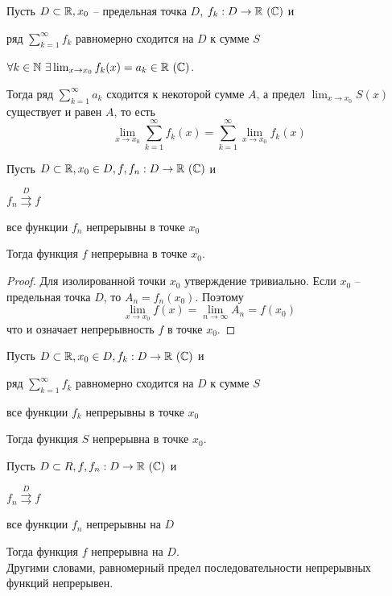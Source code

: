 \begin{Thm}
	Пусть $D \subset \mathbb{R}, x_0$ -- предельная точка $D$, $f_k : D \to \mathbb{R} \ (\mathbb{C})$ и
	\begin{MyList}
		\item ряд $\sum_{k=1}^{\infty} f_k$ равномерно сходится на $D$ к сумме $S$
		\item $\forall k \in \mathbb{N} \ \exists \lim_{x \to x_0} f_k(x) = a_k \in \mathbb{R} \ (\mathbb{C})$.  
	\end{MyList}
	Тогда ряд $\sum_{k=1}^{\infty} a_k$ сходится к некоторой сумме $A$, а предел $\lim_{x \to x_0} S(x)$ существует и равен $A$, то есть
	\[\lim_{x \to x_0} \sum_{k=1}^{\infty} f_k(x) = \sum_{k=1}^{\infty} \lim_{x \to x_0} f_k(x)\]  
\end{Thm}

\begin{Cons}
	Пусть $D \subset \mathbb{R}, x_0 \in D, f, f_n : D \to \mathbb{R} \ (\mathbb{C})$ и
	\begin{MyList}
		\item $f_n \overset{D}{\rightrightarrows} f$  
		\item все функции $f_n$ непрерывны в точке $x_0$ 
	\end{MyList} 
	Тогда функция $f$ непрерывна в точке $x_0$.
\end{Cons}

\begin{proof}
	Для изолированной точки $x_0$ утверждение тривиально. Если $x_0$ -- предельная точка $D$, то $A_n = f_n(x_0)$. Поэтому
	\[\lim_{x \to x_0} f(x) = \lim_{n \to \infty} A_n = f(x_0)\]
	что и означает непрерывность $f$ в точке $x_0$.
\end{proof}

\begin{Cons}
	Пусть $D \subset \mathbb{R}, x_0 \in D, f_k : D \to \mathbb{R} \ (\mathbb{C})$ и
	\begin{MyList}
		\item ряд $\sum_{k=1}^{\infty} f_k$ равномерно сходится на $D$ к сумме $S$
		\item все функции $f_k$ непрерывны в точке $x_0$ 
	\end{MyList} 
	Тогда функция $S$ непрерывна в точке $x_0$.
\end{Cons}

\begin{Cons}
	Пусть $D \subset R, f, f_n : D \to \R \ (\C)$ и
	\begin{MyList}
		\item $f_n \overset{D}{\rightrightarrows} f$
		\item все функции $f_n$ непрерывны на $D$  
	\end{MyList} 
	Тогда функция $f$ непрерывна на $D$. \\
	Другими словами, равномерный предел последовательности непрерывных функций непрерывен.
\end{Cons}

